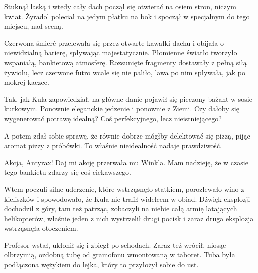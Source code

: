 Stuknął laską i wtedy cały dach począł się otwierać na osiem stron, niczym kwiat. 
Żyradol poleciał na jedym płatku na bok i spoczął w specjalnym do tego miejscu, nad sceną.

Czerwona śmierć przelewała się przez otwarte kawałki dachu i obijała o niewidzialną barierę, spływając majestatycznie.
Płomienne światło tworzyło wspaniałą, bankietową atmosferę.
Rozsunięte fragmenty dostawały z pełną siłą żywiołu, lecz czerwone futro wcale się nie paliło, lawa po nim spływała, jak po mokrej kaczce.

Tak, jak Kula zapowiedział, na główne danie pojawił się pieczony bażant w sosie kurkowym.
Ponownie eleganckie jedzenie i ponownie z Ziemi. 
Czy dałoby się wygenerować potrawę idealną? 
Coś perfekcyjnego, lecz nieistniejącego?

A potem zdał sobie sprawę, że równie dobrze mógłby delektować się pizzą, pijąc aromat pizzy z próbówki.
To właśnie nieidealność nadaje prawdziwość.

\divider{} 

\begin{dialogue}
\ds{} Akcja, Antyrax! Daj mi akcję \dm{} przerwała mu Winkla. \dm{} Mam nadzieję, że w czasie tego bankietu zdarzy się coś ciekawszego.
\end{dialogue}

\divider{}
Wtem poczuli silne uderzenie, które wstrząsnęło statkiem, porozlewało wino z kieliszków i spowodowało, że Kula nie trafił widelcem w obiad.
Dźwięk eksplozji dochodził z góry, tam też patrząc, zobaczyli na niebie całą armię latających helikopterów, właśnie jeden z nich wystrzelił drugi pocisk i zaraz druga eksplozja wstrząsnęła otoczeniem.

Profesor wstał, ukłonił się i zbiegł po schodach. Zaraz też wrócił, niosąc olbrzymią, ozdobną tubę od gramofonu wmontowaną w taboret. Tuba była podłączona wężykiem do lejka, który to przyłożył sobie do ust.

